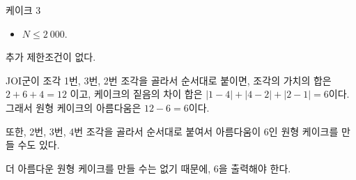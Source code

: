 \begin{problem}{케이크 3}
	\begin{itemize}
		\item $N \le 2\ 000$.
	\end{itemize}


	추가 제한조건이 없다.
	
	\Examples
	
	\begin{example}
	\end{example}
	
	JOI군이 조각 1번, 3번, 2번 조각을 골라서 순서대로 붙이면, 조각의 가치의 합은 $2+6+4=12$ 이고, 케이크의 짙음의 차이 합은 $|1-4|+|4-2|+|2-1|=6$이다. 그래서 원형 케이크의 아름다움은 $12-6=6$이다.
	
	또한, 2번, 3번, 4번 조각을 골라서 순서대로 붙여서 아름다움이 6인 원형 케이크를 만들 수도 있다.
	
	더 아름다운 원형 케이크를 만들 수는 없기 때문에, 6을 출력해야 한다.
	\begin{example}
	\end{example}
	
	
\end{problem}

